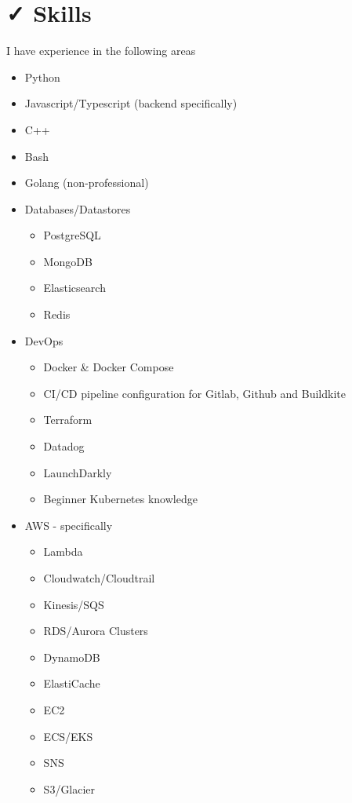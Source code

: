 \documentclass{resume}
\begin{document}
\section{{\faCheck} Skills}
I have experience in the following areas \\
\bigskip
\begin{minipage}[t]{0.3\textwidth}
  \begin{itemize}
    \item Python
    \item Javascript/Typescript (backend specifically)
    \item C++
    \item Bash
    \item Golang (non-professional)
    \item Databases/Datastores
    \begin{itemize}
      \item PostgreSQL
      \item MongoDB
      \item Elasticsearch
      \item Redis
    \end{itemize}
  \end{itemize}
\end{minipage}
\begin{minipage}[t]{0.3\textwidth}
  \begin{itemize}
    \item DevOps
    \begin{itemize}
      \item Docker \& Docker Compose
      \item CI/CD pipeline configuration for Gitlab, Github and Buildkite
      \item Terraform
      \item Datadog
      \item LaunchDarkly
      \item Beginner Kubernetes knowledge
    \end{itemize}
  \end{itemize}
\end{minipage}
\begin{minipage}[t]{0.3\textwidth}
  \begin{itemize}
    \item AWS - specifically
    \begin{itemize}
      \item Lambda
      \item Cloudwatch/Cloudtrail
      \item Kinesis/SQS
      \item RDS/Aurora Clusters
      \item DynamoDB
      \item ElastiCache
      \item EC2
      \item ECS/EKS
      \item SNS
      \item S3/Glacier
    \end{itemize}
  \end{itemize}
\end{minipage}
\end{document}
